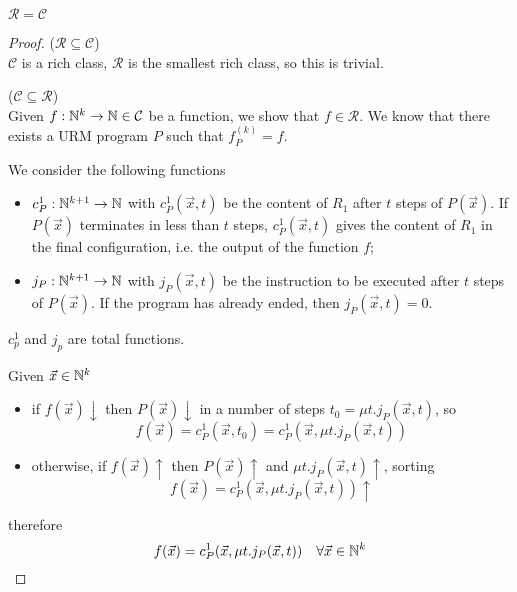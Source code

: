 \begin{theorem}\label{reqc} 
  $\mathcal{R} = \mathcal{C}$
  \begin{proof}
    ($ \mathcal{R} \subseteq \mathcal{C} $) \\
    $\mathcal{C} $ is a rich class, $\mathcal{R}$ is the
    smallest rich class, so this is trivial.

    ($ \mathcal{C} \subseteq \mathcal{R} $) \\
    Given $ f : \mathbb{N}^k \to \mathbb{N} \in \mathcal{C} $ be a function, we show
    that $ f \in \mathcal{R} $. We know that there exists a URM program $P$ such that $ f_P^{(k)} = f$.

    We consider the following functions
    \begin{itemize}
      \item $c_P^1:\mathbb{N}^{k+1}\to\mathbb{N}$ with $ c_P^1(\vec{x}, t) $ be the content of $R_1$ after $t$ steps of $ P(\vec{x}) $. 
            If $P(\vec{x})$ terminates in less than $t$ steps, $ c_P^1(\vec{x}, t) $ gives the content of $R_1$ in the final configuration, i.e. the output of the function $f$;
      \item $j_P:\mathbb{N}^{k+1}\to\mathbb{N}$ with $ j_P(\vec{x},t) $ be the instruction to be executed after $t$ steps of $P(\vec{x})$. If the program has already ended, then $ j_P(\vec{x},t) = 0$.
    \end{itemize}

    $c_p^1$ and $j_p$ are total functions.

    Given $\vec{x}\in\mathbb{N}^k$
    \begin{itemize}
      \item if $ f(\vec{x})\downarrow $ then $ P(\vec{x})\downarrow $ in a number of steps $ t_0 = \mu t.j_P(\vec{x},t)$, so 
      \begin{equation*}
        f(\vec{x}) = c_P^1(\vec{x},t_0) = c_P^1(\vec{x}, \mu t.j_P(\vec{x},t))
      \end{equation*}
      \item otherwise, if $ f(\vec{x})\uparrow $ then $P(\vec{x})\uparrow$ and $ \mu t.j_P(\vec{x},t)\uparrow $, sorting
      \begin{equation*}
        f(\vec{x}) = c_P^1(\vec{x}, \mu t.j_P(\vec{x},t))\uparrow
      \end{equation*}
    \end{itemize}
    therefore
    \begin{equation*}
      f(\vec{x}) = c_P^1(\vec{x}, \mu t.j_P(\vec{x},t)) \quad \forall \vec{x}\in\mathbb{N}^k
    \end{equation*}


\end{proof}
\end{theorem}
